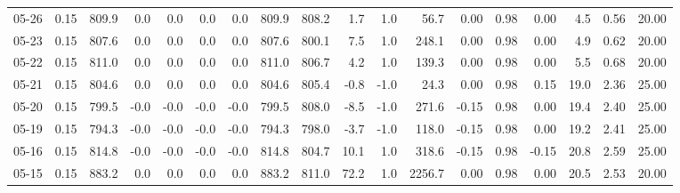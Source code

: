 \begin{threeparttable}
{\begin{tabular}{lrrrrrrrrrrrrrrrrr}
  05-26 &     0.15 & 809.9 &               0.0 &               0.0 &                0.0 &                0.0 & 809.9 & 808.2 &        1.7 &                      1.0 &                56.7 &       0.00 &      0.98 &           0.00 &              4.5 &            0.56 &                  20.00 \\
  05-23 &     0.15 & 807.6 &               0.0 &               0.0 &                0.0 &                0.0 & 807.6 & 800.1 &        7.5 &                      1.0 &               248.1 &       0.00 &      0.98 &           0.00 &              4.9 &            0.62 &                  20.00 \\
  05-22 &     0.15 & 811.0 &               0.0 &               0.0 &                0.0 &                0.0 & 811.0 & 806.7 &        4.2 &                      1.0 &               139.3 &       0.00 &      0.98 &           0.00 &              5.5 &            0.68 &                  20.00 \\
  05-21 &     0.15 & 804.6 &               0.0 &               0.0 &                0.0 &                0.0 & 804.6 & 805.4 &       -0.8 &                     -1.0 &                24.3 &       0.00 &      0.98 &           0.15 &             19.0 &            2.36 &                  25.00 \\
  05-20 &     0.15 & 799.5 &              -0.0 &              -0.0 &               -0.0 &               -0.0 & 799.5 & 808.0 &       -8.5 &                     -1.0 &               271.6 &      -0.15 &      0.98 &           0.00 &             19.4 &            2.40 &                  25.00 \\
  05-19 &     0.15 & 794.3 &              -0.0 &              -0.0 &               -0.0 &               -0.0 & 794.3 & 798.0 &       -3.7 &                     -1.0 &               118.0 &      -0.15 &      0.98 &           0.00 &             19.2 &            2.41 &                  25.00 \\
  05-16 &     0.15 & 814.8 &              -0.0 &              -0.0 &               -0.0 &               -0.0 & 814.8 & 804.7 &       10.1 &                      1.0 &               318.6 &      -0.15 &      0.98 &          -0.15 &             20.8 &            2.59 &                  25.00 \\
  05-15 &     0.15 & 883.2 &               0.0 &               0.0 &                0.0 &                0.0 & 883.2 & 811.0 &       72.2 &                      1.0 &              2256.7 &       0.00 &      0.98 &           0.00 &             20.5 &            2.53 &                  20.00 \\

\end{tabular}}
\end{threeparttable}
